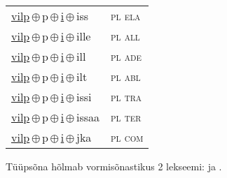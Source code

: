 \begin{minipage}{\textwidth}
\begin{sideways}
\begin{tabular}{l l}
\underline{vilp}\,$\oplus$\,p\,$\oplus$\,\underline{i}\,$\oplus$\,iss & \textsc{ pl ela } \\
\underline{vilp}\,$\oplus$\,p\,$\oplus$\,\underline{i}\,$\oplus$\,ille & \textsc{ pl all } \\
\underline{vilp}\,$\oplus$\,p\,$\oplus$\,\underline{i}\,$\oplus$\,ill & \textsc{ pl ade } \\
\underline{vilp}\,$\oplus$\,p\,$\oplus$\,\underline{i}\,$\oplus$\,ilt & \textsc{ pl abl } \\
\underline{vilp}\,$\oplus$\,p\,$\oplus$\,\underline{i}\,$\oplus$\,issi & \textsc{ pl tra } \\
\underline{vilp}\,$\oplus$\,p\,$\oplus$\,\underline{i}\,$\oplus$\,issaa & \textsc{ pl ter } \\
\underline{vilp}\,$\oplus$\,p\,$\oplus$\,\underline{i}\,$\oplus$\,jka & \textsc{ pl com } \\
\end{tabular}
\end{sideways}
\label{tab:tüüpsõnamall-vilppi}

\end{minipage}

 
\vspace{1em}
\noindent Tüüpsõna hõlmab vormisõnastikus 2 lekseemi:  ja .
